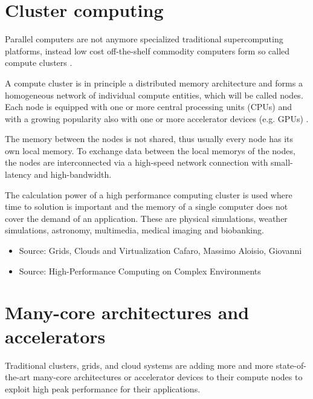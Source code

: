 \section{Cluster computing}
\label{sec:cluster}
Parallel computers are not anymore specialized traditional
supercomputing platforms, instead low cost off-the-shelf commodity
computers form so called compute clusters \cite{ref:hpcc1}.

A compute cluster is in principle a distributed memory architecture
and forms a homogeneous network of individual compute entities, which
will be called nodes. Each node is equipped with one or more central
processing units (CPUs) and with a growing popularity also with one or
more accelerator devices (e.g. GPUs) \cite{ref:accel}.

The memory between the nodes is not shared, thus usually every node
has its own local memory. To exchange data between the local memorys
of the nodes, the nodes are interconnected via a high-speed network
connection with small-latency and high-bandwidth.

The calculation power of a high performance computing cluster
is used where time to solution is important and the memory
of a single computer does not cover the demand of an application. These are
physical simulations\cite{ref:picongpu}, weather simulations, astronomy,
multimedia, medical imaging and biobanking.

\begin{itemize}
  \item Source: Grids, Clouds and Virtualization Cafaro, Massimo Aloisio, Giovanni
  \item Source: High-Performance Computing on Complex Environments
\end{itemize}

\section{Many-core architectures and accelerators}
\label{sec:accel}

Traditional clusters, grids, and cloud systems are adding more and
more state-of-the-art many-core architectures or accelerator devices
to their compute nodes to exploit high peak performance for their applications.

